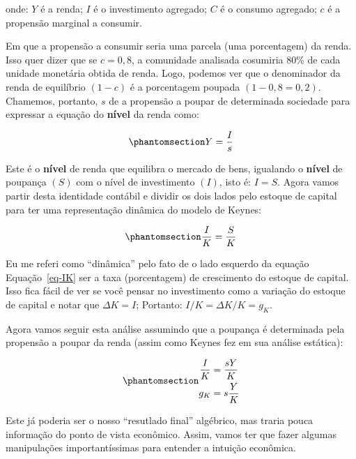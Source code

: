 \documentclass[
  brazilian,
  letterpaper,
  DIV=11,
  numbers=noendperiod]{scrreprt}
\begin{document}
onde: \(Y\) é a renda; \(I\) é o investimento agregado; \(C\) é o
consumo agregado; \(c\) é a propensão marginal a consumir.

Em que a propensão a consumir seria uma parcela (uma porcentagem) da
renda. Isso quer dizer que se \(c=0,8\), a comunidade analisada
cosumiria 80\% de cada unidade monetária obtida de renda. Logo, podemos
ver que o denominador da renda de equilíbrio \((1-c)\) é a porcentagem
poupada \((1-0,8=0,2)\). Chamemos, portanto, \(s\) de a propensão a
poupar de determinada sociedade para expressar a equação do
\textbf{nível} da renda como:

\begin{equation}\protect\phantomsection\label{eq-Y}{Y=\frac{I}{s}}\end{equation}

Este é o \textbf{nível} de renda que equilibra o mercado de bens,
igualando o \textbf{nível} de poupança \((S)\) com o nível de
investimento \((I)\), isto é: \(I=S\). Agora vamos partir desta
identidade contábil e dividir os dois lados pelo estoque de capital para
ter uma representação dinâmica do modelo de Keynes:

\begin{equation}\protect\phantomsection\label{eq-IK}{
\frac{I}{K}=\frac{S}{K}
}\end{equation}

Eu me referi como ``dinâmica'' pelo fato de o lado esquerdo da equação
Equação~\ref{eq-IK} ser a taxa (porcentagem) de crescimento do estoque
de capital. Isso fica fácil de ver se você pensar no investimento como a
variação do estoque de capital e notar que \(\Delta K = I\); Portanto:
\(I/K = \Delta K / K = g_K\).

Agora vamos seguir esta análise assumindo que a poupança é determinada
pela propensão a poupar da renda (assim como Keynes fez em sua análise
estática):

\begin{equation}\protect\phantomsection\label{eq-gk-cont}{\begin{aligned}
\frac{I}{K} &= \frac{s Y}{K}\\
g_K &= s \frac{Y}{K}
\end{aligned}}\end{equation}

Este já poderia ser o nosso ``resutlado final'' algébrico, mas traria
pouca informação do ponto de vista econômico. Assim, vamos ter que fazer
algumas manipulações importantíssimas para entender a intuição
econômica.
\end{document}
